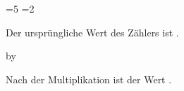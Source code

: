 =5 %
=2

Der ursprüngliche Wert des Zählers ist \the{}. %

\multiply{} by  %

Nach der Multiplikation ist der Wert \the{}.

\bye
